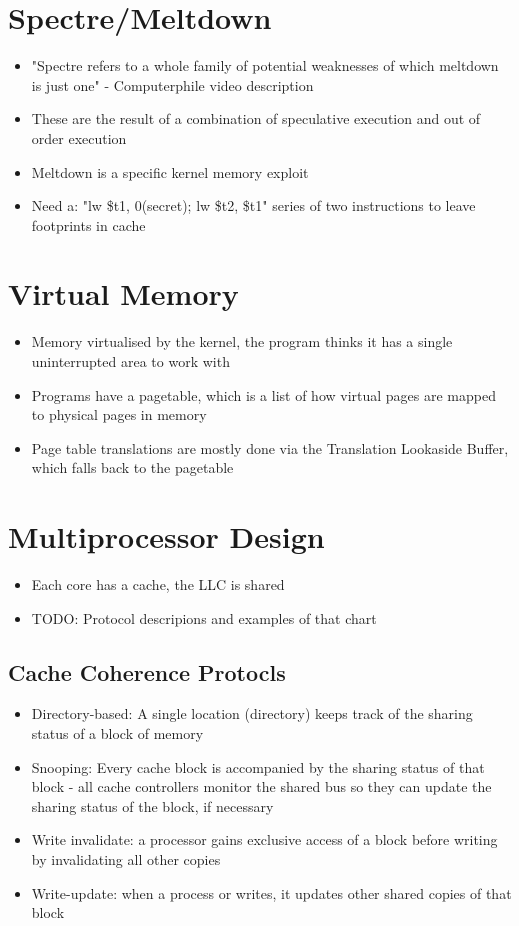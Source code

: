 \documentclass[letterpaper,landscape]{article}
\begin{document}
\begin{multicols}{2}
\section{Spectre/Meltdown}
\begin{itemize}
	\item "Spectre refers to a whole family of potential weaknesses of which meltdown is just one" - Computerphile video description
	\item These are the result of a combination of speculative execution and out of order execution
	\item Meltdown is a specific kernel memory exploit
	\item Need a: "lw \$t1, 0(secret); lw \$t2, \$t1" series of two instructions to leave footprints in cache
\end{itemize}


\section{Virtual Memory}
\begin{itemize}
	\item Memory virtualised by the kernel, the program thinks it has a single uninterrupted area to work with
	\item Programs have a pagetable, which is a list of how virtual pages are mapped to physical pages in memory
	\item Page table translations are mostly done via the Translation Lookaside Buffer, which falls back to the pagetable
\end{itemize}

\begin{itemize}
\end{itemize}


\section{Multiprocessor Design}
\begin{itemize}
	\item Each core has a cache, the LLC is shared
	\item TODO: Protocol descripions and examples of that chart
\end{itemize}
\subsection*{Cache Coherence Protocls}
\begin{itemize}
	\item Directory-based: A single location (directory) keeps track of the sharing status of a block of memory
	\item Snooping: Every cache block is accompanied by the sharing status of that block - all cache controllers monitor the shared bus so they can update the sharing status of the block, if necessary
	\item Write invalidate: a processor gains exclusive access of a block before writing by invalidating all other copies
	\item Write-update: when a process or writes, it updates other shared copies of that block~
\end{itemize}

\end{multicols}
\end{document}
